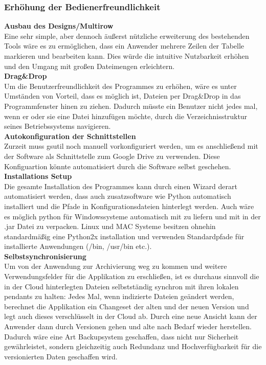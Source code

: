 \documentclass[12pt,a4paper,bibliography=totocnumbered,listof=totocnumbered]{scrartcl}
\begin{document}
\subsubsection{Erhöhung der Bedienerfreundlichkeit}
\textbf{Ausbau des Designs/Multirow}\\
Eine sehr simple, aber dennoch äußerst nützliche erweiterung des bestehenden Tools wäre es zu ermöglichen, dass ein Anwender mehrere Zeilen der Tabelle markieren und bearbeiten kann. Dies würde die intuitive Nutzbarkeit erhöhen und den Umgang mit großen Dateimengen erleichtern. 
\\\textbf{Drag\&Drop}\\
Um die Benutzerfreundlichkeit des Programmes zu erhöhen, wäre es unter Umständen von Vorteil, dass es möglich ist, Dateien per Drag\&Drop in das Programmfenster hinen zu ziehen. Dadurch müsste ein Benutzer nicht jedes mal, wenn er oder sie eine Datei hinzufügen möchte, durch die Verzeichnisstruktur seines Betriebssystems navigieren.
\\\textbf{Autokonfiguration der Schnittstellen}\\
Zurzeit muss gsutil noch manuell vorkonfiguriert werden, um es anschließend mit der Software als Schnittstelle zum Google Drive zu verwenden. Diese Konfiguartion könnte automatisiert durch die Software selbst geschehen.
\\\textbf{Installations Setup}\\
Die gesamte Installation des Programmes kann durch einen Wizard derart automatisiert werden, dass auch zusatzsoftware wie Python automatisch installiert und die Pfade in Konfigurationsdateien hinterlegt werden. Auch wäre es möglich python für Windowssysteme automatisch mit zu liefern und mit in der .jar Datei zu verpacken. Linux und MAC Systeme besitzen ohnehin standardmäßig eine Python2x installation und verwenden Standardpfade für installierte Anwendungen (/bin, /usr/bin etc.).
\\\textbf{Selbstsynchronisierung}\\
Um von der Anwendung zur Archivierung weg zu kommen und weitere Verwendungsfelder für die Applikation zu erschließen, ist es durchaus sinnvoll die in der Cloud hinterlegten Dateien selbstständig synchron mit ihren lokalen pendants zu halten: Jedes Mal, wenn indizierte Dateien geändert werden, berechnet die Applikation ein Changeset der alten und der neuen Version und legt auch dieses verschlüsselt in der Cloud ab. Durch eine neue Ansicht kann der Anwender dann durch Versionen gehen und alte nach Bedarf wieder herstellen. Dadurch wäre eine Art Backupsystem geschaffen, dass nicht nur Sicherheit gewährleistet, sondern gleichzeitig auch Redundanz und Hochverfügbarkeit für die versionierten Daten geschaffen wird.
\end{document}
